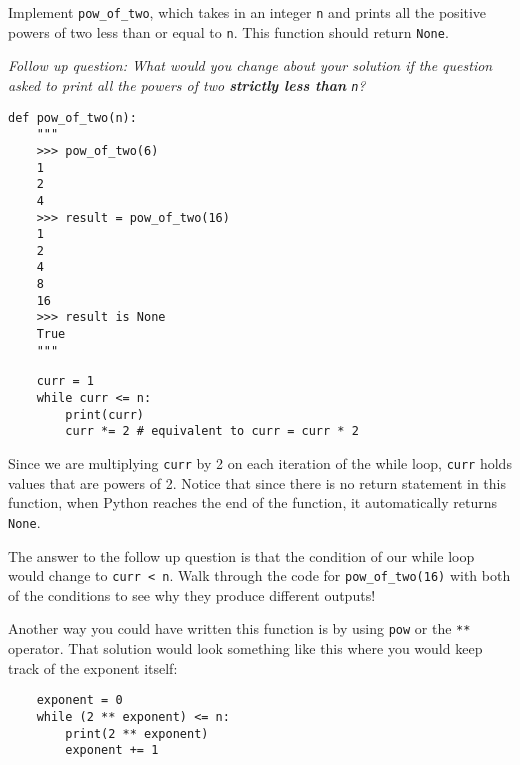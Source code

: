 \begin{blocksection}
\question Implement \lstinline{pow_of_two}, which takes in an integer \lstinline{n} and
prints all the positive powers of two less than or equal to \lstinline{n}. This function should return \lstinline{None}.

\textit{Follow up question: What would you change about your solution if the question asked to print all the powers of two \textbf{strictly less than} \lstinline{n}?}

\begin{lstlisting}
def pow_of_two(n):
    """
    >>> pow_of_two(6)
    1
    2
    4
    >>> result = pow_of_two(16)
    1
    2
    4
    8
    16
    >>> result is None
    True
    """
\end{lstlisting}
\begin{solution}[2in]
\begin{lstlisting}
    curr = 1
    while curr <= n:
        print(curr)
        curr *= 2 # equivalent to curr = curr * 2
\end{lstlisting}
Since we are multiplying \lstinline{curr} by 2 on each iteration of the while loop, \lstinline{curr} holds values that are powers of 2.
Notice that since there is no return statement in this function, when Python reaches the end of the function, it automatically returns \lstinline{None}.

The answer to the follow up question is that the condition of our while loop would change to \lstinline{curr < n}.
Walk through the code for \lstinline$pow_of_two(16)$ with both of the conditions to see why they produce different outputs!

Another way you could have written this function is by using \lstinline{pow} or the \lstinline{**} operator. That solution would look something like this where you would keep track of the exponent itself:

\begin{lstlisting}
    exponent = 0
    while (2 ** exponent) <= n:
        print(2 ** exponent)
        exponent += 1
\end{lstlisting}
\end{solution}
\end{blocksection}
